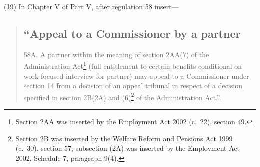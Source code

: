 \documentclass[12pt,a4paper]{article}
\begin{document}
%
%
%
%
%
%

(19) In Chapter V of Part V, after regulation 58 insert—
\begin{quotation}
\subsection*{“Appeal to a Commissioner by a partner}

58A.  A partner within the meaning of section 2AA(7) of the Administration Act\footnote{Section 2AA was inserted by the Employment Act 2002 (c.\ 22), section 49.} (full entitlement to certain benefits conditional on work-focused interview for partner) may appeal to a Commissioner under section 14 from a decision of an appeal tribunal in respect of a decision specified in section 2B(2A) and (6)\footnote{Section 2B was inserted by the Welfare Reform and Pensions Act 1999 (c.\ 30), section 57; subsection (2A) was inserted by the Employment Act 2002, Schedule 7, paragraph 9(4).} of the Administration Act.”.
\end{quotation}
\end{document}
